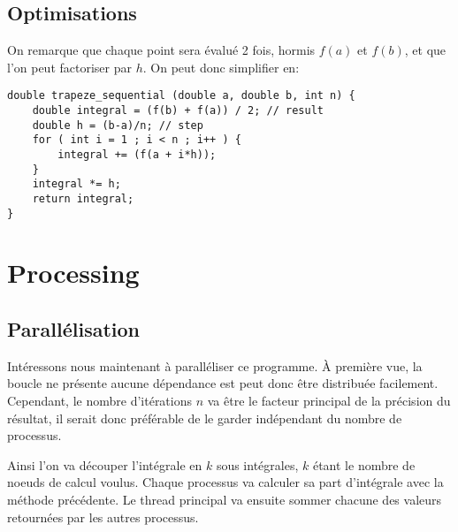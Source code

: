 \documentclass{article}
\begin{document}
\subsection{Optimisations}

On remarque que chaque point sera évalué 2 fois, hormis $f(a)$ et $f(b)$, et que l'on peut factoriser par $h$.
On peut donc simplifier en:

\begin{lstlisting}[style=ccode, morekeywords={f}]
double trapeze_sequential (double a, double b, int n) {
    double integral = (f(b) + f(a)) / 2; // result
    double h = (b-a)/n; // step
    for ( int i = 1 ; i < n ; i++ ) {
        integral += (f(a + i*h));
    }
    integral *= h;
    return integral;
}
\end{lstlisting}

\newpage
\section{Processing}
\subsection{Parallélisation}

Intéressons nous maintenant à paralléliser ce programme.
À première vue, la boucle ne présente aucune dépendance est peut donc être distribuée facilement.
Cependant, le nombre d'itérations $n$ va être le facteur principal de la précision du résultat, il serait donc préférable de le garder indépendant du nombre de processus.

Ainsi l'on va découper l'intégrale en $k$ sous intégrales, $k$ étant le nombre de noeuds de calcul voulus. Chaque processus va calculer sa part d'intégrale avec la méthode précédente. Le thread principal va ensuite sommer chacune des valeurs retournées par les autres processus.
\end{document}
